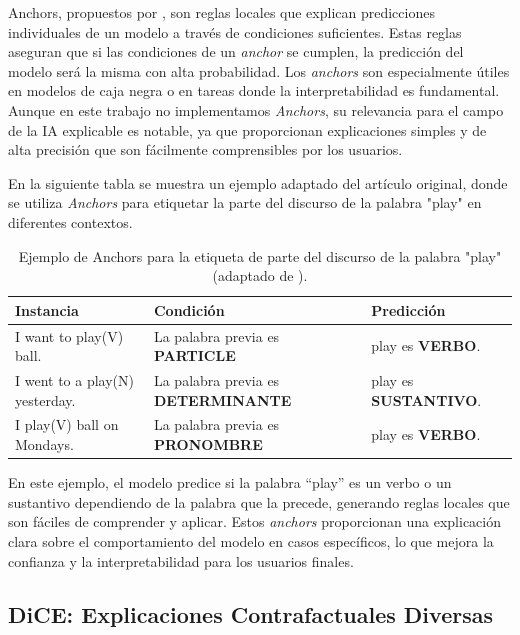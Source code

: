 Anchors, propuestos por \textcite{ribeiro2018anchors}, son reglas locales que explican predicciones individuales de un modelo a través de condiciones suficientes. Estas reglas aseguran que si las condiciones de un \textit{anchor} se cumplen, la predicción del modelo será la misma con alta probabilidad. Los \textit{anchors} son especialmente útiles en modelos de caja negra o en tareas donde la interpretabilidad es fundamental. Aunque en este trabajo no implementamos \textit{Anchors}, su relevancia para el campo de la IA explicable es notable, ya que proporcionan explicaciones simples y de alta precisión que son fácilmente comprensibles por los usuarios.

En la siguiente tabla se muestra un ejemplo adaptado del artículo original, donde se utiliza \textit{Anchors} para etiquetar la parte del discurso de la palabra "play" en diferentes contextos.

\begin{table}[H]
    \centering
    \scriptsize %
    \renewcommand{\arraystretch}{1.5} %
    \begin{tabular}{p{4cm} p{5.5cm} p{3.2cm}}
        \toprule
        \textbf{Instancia} & \textbf{Condición} & \textbf{Predicción} \\
        \midrule
        I want to play(V) ball. & La palabra previa es \textbf{PARTICLE} & play es \textbf{VERBO}. \\ 
        I went to a play(N) yesterday. & La palabra previa es \textbf{DETERMINANTE} & play es \textbf{SUSTANTIVO}. \\ 
        I play(V) ball on Mondays. & La palabra previa es \textbf{PRONOMBRE} & play es \textbf{VERBO}. \\
        \bottomrule
    \end{tabular}
    \caption{Ejemplo de Anchors para la etiqueta de parte del discurso de la palabra "play" (adaptado de \textcite{ribeiro2018anchors}).}
    \label{tab:anchors-pos}
\end{table}

\noindent
En este ejemplo, el modelo predice si la palabra ``play'' es un verbo o un sustantivo dependiendo de la palabra que la precede, generando reglas locales que son fáciles de comprender y aplicar. Estos \textit{anchors} proporcionan una explicación clara sobre el comportamiento del modelo en casos específicos, lo que mejora la confianza y la interpretabilidad para los usuarios finales.

\subsection{DiCE: Explicaciones Contrafactuales Diversas}

